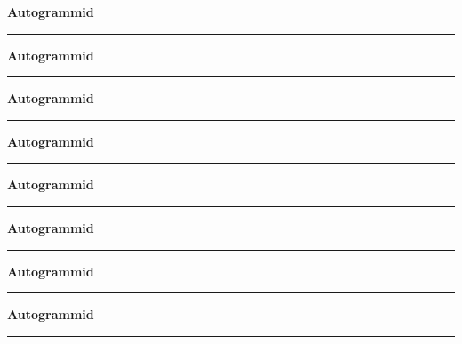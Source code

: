 \pagebreak[3]
\null
\cleardoublepage
{\samepage\raggedbottom
\raggedright
\sloppy
\centerline{ {\bf {\large Autogrammid}}}
\vspace{0.1in}
\hrule height 0.05ex}
\null
\clearpage
{\samepage\raggedbottom
\raggedright
\sloppy
\centerline{ {\bf {\large Autogrammid}}}
\vspace{0.1in}
\hrule height 0.05ex}
\null
\clearpage
{\samepage\raggedbottom
\raggedright
\sloppy
\centerline{ {\bf {\large Autogrammid}}}
\vspace{0.1in}
\hrule height 0.05ex}
\null
\clearpage
{\samepage\raggedbottom
\raggedright
\sloppy
\centerline{ {\bf {\large Autogrammid}}}
\vspace{0.1in}
\hrule height 0.05ex}
\null
\clearpage
{\samepage\raggedbottom
\raggedright
\sloppy
\centerline{ {\bf {\large Autogrammid}}}
\vspace{0.1in}
\hrule height 0.05ex}
\null
\clearpage
{\samepage\raggedbottom
\raggedright
\sloppy
\centerline{ {\bf {\large Autogrammid}}}
\vspace{0.1in}
\hrule height 0.05ex}
\null
\clearpage
{\samepage\raggedbottom
\raggedright
\sloppy
\centerline{ {\bf {\large Autogrammid}}}
\vspace{0.1in}
\hrule height 0.05ex}
\null
\clearpage
{\samepage\raggedbottom
\raggedright
\sloppy
\centerline{ {\bf {\large Autogrammid}}}
\vspace{0.1in}
\hrule height 0.05ex}

\begin{flushleft}
\printindex
\end{flushleft}


